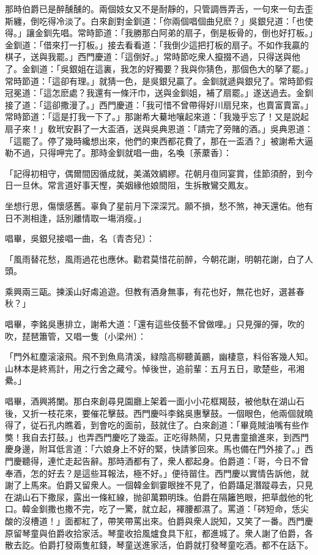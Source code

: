 那時伯爵已是醉醺醺的。兩個妓女又不是耐靜的，只管調唇弄舌，一句來一句去歪斯纏，倒吃得冷淡了。白來創對金釧道：「你兩個唱個曲兒麽？」吳銀兒道：「也使得。」讓金釧先唱。常時節道：「我勝那白阿弟的扇子，倒是板骨的，倒也好打板。」金釧道：「借來打一打板。」接去看看道：「我倒少這把打板的扇子。不如作我贏的棋子，送與我罷。」西門慶道：「這倒好。」常時節吃衆人攛掇不過，只得送與他了。金釧道：「吳銀姐在這裏，我怎的好獨要？我與你猜色，那個色大的拏了罷。」常時節道：「這卻有理。」就猜一色，是吳銀兒贏了。金釧就遞與銀兒了。常時節假冠冕道：「這怎麽處？我還有一條汗巾，送與金釧姐，補了扇罷。」遂送過去。金釧接了道：「這卻撒漫了。」西門慶道：「我可惜不曾帶得好川扇兒來，也賣富賣富。」常時節道：「這是打我一下了。」那謝希大驀地嚷起來道：「我幾乎忘了！又是説起扇子來！」敎玳安斟了一大盃酒，送與吳典恩道：「請完了旁賭的酒。」吳典恩道：「這罷了。停了幾時纔想出來，他們的東西都花費了，那在一盃酒？」被謝希大逼勒不過，只得呷完了。那時金釧就唱一曲，名喚〔荼䕷香〕：

\begin{myquote}
「記得初相守，偶爾間因循成就，美滿效綢繆。花朝月亱同宴賞，佳節須酧，到今日一旦休。常言道好事天慳，美姻緣他娘間阻，生拆散鸞交鳳友。

坐想行思，傷懷感舊。辜負了星前月下深深咒。願不損，愁不煞，神天還佑。他有日不測相逢，話別離情取一塲消瘦。」
\end{myquote}

唱畢，吳銀兒接唱一曲，名〔青杏兒〕：

\begin{myquote}
「風雨替花愁，風雨過花也應休。勸君莫惜花前醉，今朝花謝，明朝花謝，白了人頭。

乘興兩三甌。揀溪山好䖏追遊。但教有酒身無事，有花也好，無花也好，選甚春秋？」
\end{myquote}

唱畢，李銘吳惠排立，謝希大道：「還有這些伎藝不曾做哩。」只見彈的彈，吹的吹，琵琶簫管，又唱一隻〔小梁州〕：

\begin{myquote}
「門外紅塵滚滚飛。飛不到魚鳥清溪，緑陰高柳聽黃鸝，幽棲意，料俗客幾人知。山林本是終焉計，用之行舍之藏兮。悼後世，追前輩：五月五日，歌楚些，弔湘纍。」
\end{myquote}

唱畢，酒興將闌。那白來創尋見園廳上架着一面小小花框羯鼓，被他馱在湖山石後，又折一枝花來，要催花擊鼓。西門慶呌李銘吳惠擊鼓。一個眼色，他兩個就曉得了，従石孔内瞧着，到會吃的面前，鼓就住了。白來創道：「畢竟賊油嘴有些作獘！我自去打鼓。」也弄西門慶吃了幾盃。正吃得熱鬧，只見書童搶進來，到西門慶身邊，附耳低言道：「六娘身上不好的緊，快請爹回來。馬也備在門外接了。」西門慶聽得，連忙走起告辭。那時酒都有了，衆人都起身。伯爵道：「哥，今日不曾奉酒，怎的好去？是這些耳報法，極不好。」便待㽞住。西門慶以實情告訴他，就謝了上馬來。伯爵又留衆人。一個韓金釧霎眼挫不見了，伯爵躡足潛蹤尋去，只見在湖山石下撒尿，露出一條紅線，抛卻萬顆明珠。伯爵在隔籬笆眼，把草戲他的牝口。韓金釧撒也撒不完，吃了一驚，就立起，褌腰都濕了。罵道：「硶短命，恁尖酸的沒槽道！」面都紅了，帶笑帶罵出來。伯爵與衆人説知，又笑了一番。西門慶原留琴童與伯爵收拾家活。琴童收拾風爐食具下舡，都進城了。衆人謝了伯爵，各散去訖。伯爵打發兩隻舡錢，琴童送進家活，伯爵就打發琴童吃酒。都不在話下。

